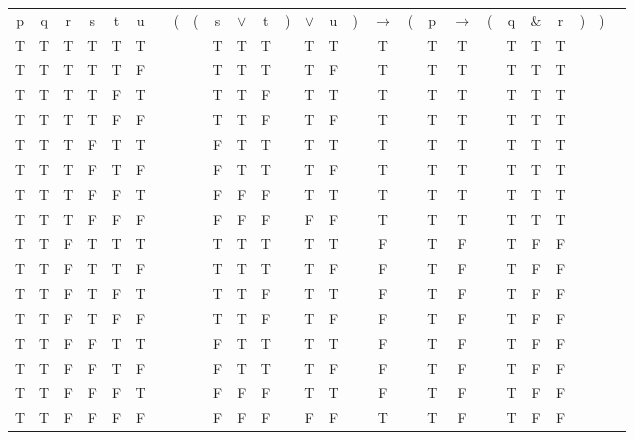 \documentclass[a4paper,10pt]{article}
\begin{document}
\begin{enumerate}
\begin{center}
\begin{longtable}{@{ }c@{ }@{ }c@{ }@{ }c@{ }@{ }c@{ }@{ }c@{ }@{ }c c@{ }@{}c@{}@{}c@{}@{ }c@{ }@{ }c@{ }@{ }c@{ }@{}c@{}@{ }c@{ }@{ }c@{ }@{}c@{}@{ }c@{ }@{}c@{}@{ }c@{ }@{ }c@{ }@{}c@{}@{ }c@{ }@{ }c@{ }@{ }c@{ }@{}c@{}@{}c@{}@{ }c}
p & q & r & s & t & u &  & ( & ( & s & $\lor$ & t & ) & $\lor$ & u & ) & $\rightarrow$ & ( & p & $\rightarrow$ & ( & q & $\&$ & r & ) & ) & \\
T & T & T & T & T & T &  &  &  & T & T & T &  & T & T &  & T &  & T & T &  & T & T & T &  &  & \\
T & T & T & T & T & F &  &  &  & T & T & T &  & T & F &  & T &  & T & T &  & T & T & T &  &  & \\
T & T & T & T & F & T &  &  &  & T & T & F &  & T & T &  & T &  & T & T &  & T & T & T &  &  & \\
T & T & T & T & F & F &  &  &  & T & T & F &  & T & F &  & T &  & T & T &  & T & T & T &  &  & \\
T & T & T & F & T & T &  &  &  & F & T & T &  & T & T &  & T &  & T & T &  & T & T & T &  &  & \\
T & T & T & F & T & F &  &  &  & F & T & T &  & T & F &  & T &  & T & T &  & T & T & T &  &  & \\
T & T & T & F & F & T &  &  &  & F & F & F &  & T & T &  & T &  & T & T &  & T & T & T &  &  & \\
T & T & T & F & F & F &  &  &  & F & F & F &  & F & F &  & T &  & T & T &  & T & T & T &  &  & \\
T & T & F & T & T & T &  &  &  & T & T & T &  & T & T &  & F &  & T & F &  & T & F & F &  &  & \\
T & T & F & T & T & F &  &  &  & T & T & T &  & T & F &  & F &  & T & F &  & T & F & F &  &  & \\
T & T & F & T & F & T &  &  &  & T & T & F &  & T & T &  & F &  & T & F &  & T & F & F &  &  & \\
T & T & F & T & F & F &  &  &  & T & T & F &  & T & F &  & F &  & T & F &  & T & F & F &  &  & \\
T & T & F & F & T & T &  &  &  & F & T & T &  & T & T &  & F &  & T & F &  & T & F & F &  &  & \\
T & T & F & F & T & F &  &  &  & F & T & T &  & T & F &  & F &  & T & F &  & T & F & F &  &  & \\
T & T & F & F & F & T &  &  &  & F & F & F &  & T & T &  & F &  & T & F &  & T & F & F &  &  & \\
T & T & F & F & F & F &  &  &  & F & F & F &  & F & F &  & T &  & T & F &  & T & F & F &  &  & \\

\end{longtable}
\end{center}
\end{enumerate}
\end{document}
